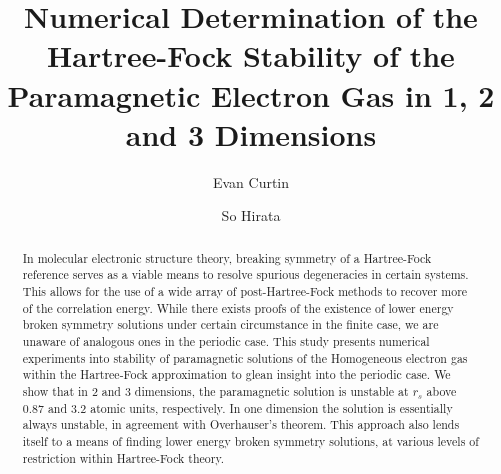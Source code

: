 \documentclass[preprint, journal=prl]{revtex4-1}
\begin{document}
\title{Numerical Determination of the Hartree-Fock Stability of the Paramagnetic Electron Gas in 1, 2 and 3 Dimensions}
\author{Evan Curtin}
\author{So Hirata}

\begin{abstract}
  In molecular electronic structure theory, breaking symmetry of a Hartree-Fock reference serves as a viable means to resolve spurious degeneracies in certain systems. This allows for the use of a wide array of post-Hartree-Fock methods to recover more of the correlation energy. While there exists proofs of the existence of lower energy broken symmetry solutions under certain circumstance in the finite case, we are unaware of analogous ones in the periodic case. This study presents numerical experiments into stability of paramagnetic solutions of the Homogeneous electron gas within the Hartree-Fock approximation to glean insight into the periodic case. We show that in 2 and 3 dimensions, the paramagnetic solution is unstable at $r_s$ above 0.87 and 3.2 atomic units, respectively. In one dimension the solution is essentially always unstable, in agreement with Overhauser's theorem. This approach also lends itself to a means of finding lower energy broken symmetry solutions, at various levels of restriction within Hartree-Fock theory.
\end{abstract}

\maketitle
\end{document}
